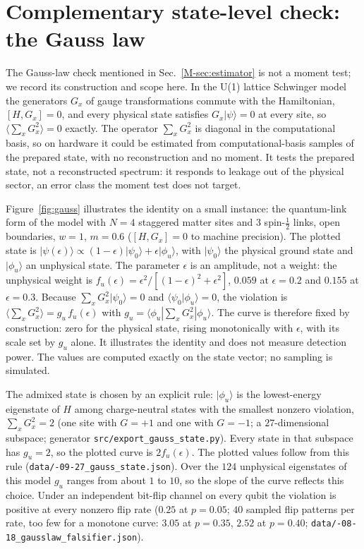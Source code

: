 \documentclass[aps,prb,onecolumn,superscriptaddress,longbibliography,floatfix]{revtex4-2}
\begin{document}
\section{Complementary state-level check: the Gauss law}
\label{app:gauss}
The Gauss-law check mentioned in Sec.~\ref{M-sec:estimator} is not a moment test; we record its construction and scope here. In the U(1) lattice Schwinger model the generators $G_x$ of gauge transformations commute with the Hamiltonian, $[H,G_x]=0$, and every physical state satisfies $G_x|\psi\rangle=0$ at every site, so $\langle\sum_x G_x^2\rangle=0$ exactly. The operator $\sum_x G_x^2$ is diagonal in the computational basis, so on hardware it could be estimated from computational-basis samples of the prepared state, with no reconstruction and no moment. It tests the prepared state, not a reconstructed spectrum: it responds to leakage out of the physical sector, an error class the moment test does not target.

Figure~\ref{fig:gauss} illustrates the identity on a small instance: the quantum-link form of the model with $N=4$ staggered matter sites and $3$ spin-$\tfrac12$ links, open boundaries, $w=1$, $m=0.6$ ($[H,G_x]=0$ to machine precision). The plotted state is $|\psi(\epsilon)\rangle\propto(1-\epsilon)|\psi_0\rangle+\epsilon|\phi_u\rangle$, with $|\psi_0\rangle$ the physical ground state and $|\phi_u\rangle$ an unphysical state. The parameter $\epsilon$ is an amplitude, not a weight: the unphysical weight is $f_u(\epsilon)=\epsilon^2/[(1-\epsilon)^2+\epsilon^2]$, $0.059$ at $\epsilon=0.2$ and $0.155$ at $\epsilon=0.3$. Because $\sum_xG_x^2|\psi_0\rangle=0$ and $\langle\psi_0|\phi_u\rangle=0$, the violation is $\langle\sum_xG_x^2\rangle=g_u\,f_u(\epsilon)$ with $g_u=\langle\phi_u|\sum_xG_x^2|\phi_u\rangle$. The curve is therefore fixed by construction: zero for the physical state, rising monotonically with $\epsilon$, with its scale set by $g_u$ alone. It illustrates the identity and does not measure detection power. The values are computed exactly on the state vector; no sampling is simulated.

The admixed state is chosen by an explicit rule: $|\phi_u\rangle$ is the lowest-energy eigenstate of $H$ among charge-neutral states with the smallest nonzero violation, $\sum_xG_x^2=2$ (one site with $G=+1$ and one with $G=-1$; a $27$-dimensional subspace; generator \texttt{src/\allowbreak export\_gauss\_state.py}). Every state in that subspace has $g_u=2$, so the plotted curve is $2f_u(\epsilon)$. The plotted values follow from this rule (\texttt{data/-09-27\_gauss\_state.json}). Over the $124$ unphysical eigenstates of this model $g_u$ ranges from about $1$ to $10$, so the slope of the curve reflects this choice. Under an independent bit-flip channel on every qubit the violation is positive at every nonzero flip rate ($0.25$ at $p=0.05$; $40$ sampled flip patterns per rate, too few for a monotone curve: $3.05$ at $p=0.35$, $2.52$ at $p=0.40$; \texttt{data/-08-18\_gausslaw\_falsifier.json}).
\end{document}
